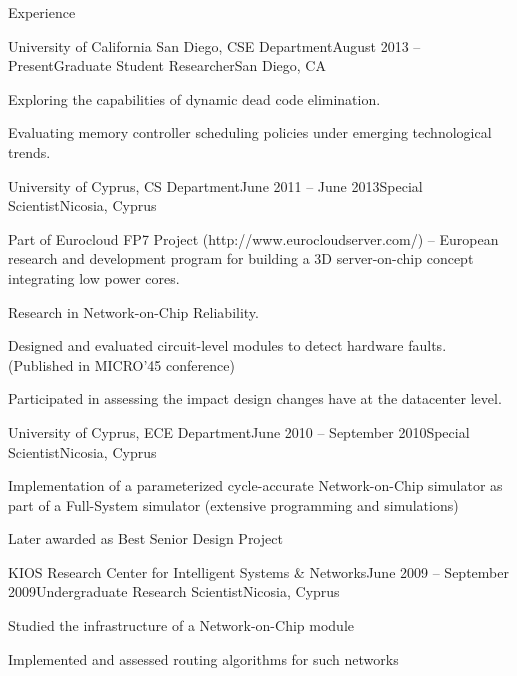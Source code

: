 \documentclass{resume} %
\begin{document}
\begin{rSection}{Experience}

\begin{rSubsection}{University of California San Diego, CSE Department}{August 2013 -- Present}{Graduate Student Researcher}{San Diego, CA}
	\item Exploring the capabilities of dynamic dead code elimination.
	\item Evaluating memory controller scheduling policies under emerging technological trends.
\end{rSubsection}


\begin{rSubsection}{University of Cyprus, CS Department}{June 2011 -- June 2013}{Special Scientist}{Nicosia, Cyprus}
	\item Part of Eurocloud FP7 Project (http://www.eurocloudserver.com/) -- European research and development program for building a 3D server-on-chip concept integrating low power cores.
	\item Research in Network-on-Chip Reliability.
	\item Designed and evaluated circuit-level modules to detect hardware faults. (Published in MICRO'45 conference)
	\item Participated in assessing the impact design changes have at the datacenter level.
\end{rSubsection}


\begin{rSubsection}{University of Cyprus, ECE Department}{June 2010 -- September 2010}{Special Scientist}{Nicosia, Cyprus}
	\item Implementation of a parameterized cycle-accurate Network-on-Chip simulator as part of a Full-System simulator (extensive programming and simulations)
	\item Later awarded as Best Senior Design Project
\end{rSubsection}


\begin{rSubsection}{KIOS Research Center for Intelligent Systems \& Networks}{June 2009 -- September 2009}{Undergraduate Research Scientist}{Nicosia, Cyprus}
	\item Studied the infrastructure of a Network-on-Chip module
	\item Implemented and assessed routing algorithms for such networks
\end{rSubsection}

\end{rSection}
\end{document}
